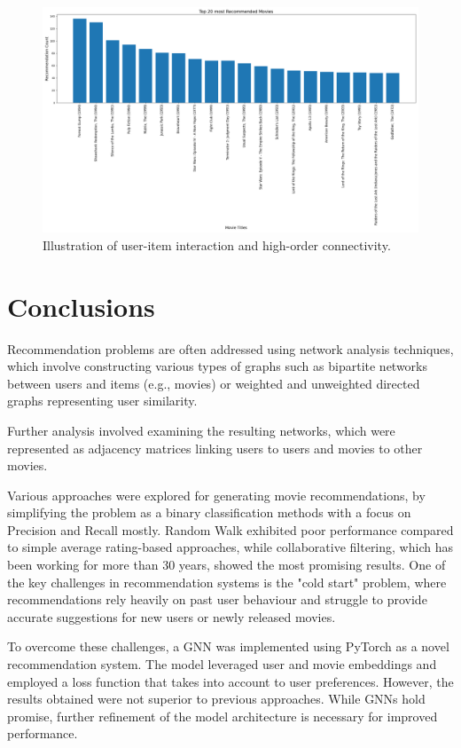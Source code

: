 \documentclass[12pt]{article}
\numberwithin{equation}{section}
\begin{document}
\begin{figure}[h]
	\centering
	\includegraphics[width=1\textwidth]{top_20_movies.png}
	\caption{Illustration of user-item interaction and high-order connectivity.}
	\label{fig:top_20_movies}
\end{figure}

\newpage
\section{Conclusions}

Recommendation problems are often addressed using network analysis techniques, which involve constructing various types of graphs such as bipartite networks between users and items (e.g., movies) or weighted and unweighted directed graphs representing user similarity.

Further analysis involved examining the resulting networks, which were represented as adjacency matrices linking users to users and movies to other movies. 

Various approaches were explored for generating movie recommendations, by simplifying the problem as a binary classification methods with a focus on Precision and Recall mostly. Random Walk exhibited poor performance compared to simple average rating-based approaches, while collaborative filtering, which has been working for more than 30 years, showed the most promising results. One of the key challenges in recommendation systems is the "cold start" problem, where recommendations rely heavily on past user behaviour and struggle to provide accurate suggestions for new users or newly released movies.

To overcome these challenges, a GNN was implemented using PyTorch as a novel recommendation system. The model leveraged user and movie embeddings and employed a loss function that takes into account to user preferences. However, the results obtained were not superior to previous approaches. While GNNs hold promise, further refinement of the model architecture is necessary for improved performance.
\end{document}
